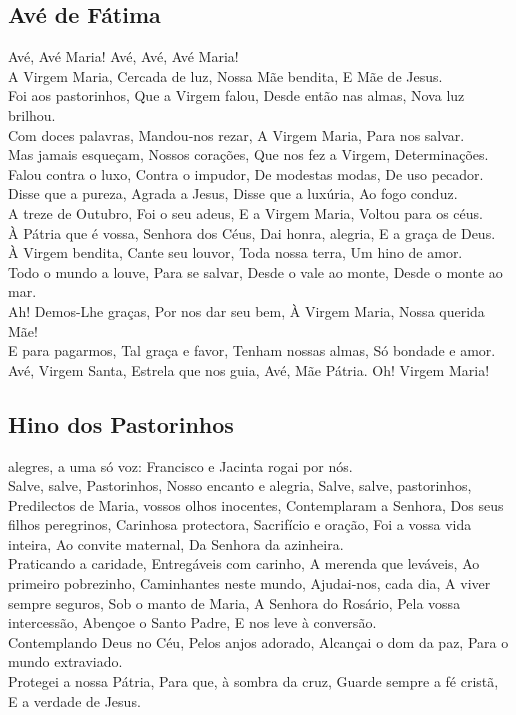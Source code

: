\subsection{Avé de Fátima}
 Avé, Avé Maria! Avé, Avé, Avé Maria!\\
A Virgem Maria, Cercada de luz, Nossa Mãe bendita, E Mãe de Jesus.\\
Foi aos pastorinhos, Que a Virgem falou, Desde então nas almas, Nova luz brilhou.\\
Com doces palavras, Mandou-nos rezar, A Virgem Maria, Para nos salvar.\\
Mas jamais esqueçam, Nossos corações, Que nos fez a Virgem, Determinações.\\
Falou contra o luxo, Contra o impudor, De modestas modas, De uso pecador.\\
Disse que a pureza, Agrada a Jesus, Disse que a luxúria, Ao fogo conduz.\\
A treze de Outubro, Foi o seu adeus, E a Virgem Maria, Voltou para os céus.\\
À Pátria que é vossa, Senhora dos Céus, Dai honra, alegria, E a graça de Deus.\\
À Virgem bendita, Cante seu louvor, Toda nossa terra, Um hino de amor.\\
Todo o mundo a louve, Para se salvar, Desde o vale ao monte, Desde o monte ao mar.\\
Ah! Demos-Lhe graças, Por nos dar seu bem, À Virgem Maria, Nossa querida Mãe!\\
E para pagarmos, Tal graça e favor, Tenham nossas almas, Só bondade e amor.\\
Avé, Virgem Santa, Estrela que nos guia, Avé, Mãe Pátria. Oh! Virgem Maria!\\

\subsection{Hino dos Pastorinhos}
 alegres, a uma só voz: Francisco e Jacinta rogai por nós.\\
Salve, salve, Pastorinhos, Nosso encanto e alegria, Salve, salve, pastorinhos, Predilectos de Maria, vossos olhos inocentes, Contemplaram a Senhora, Dos seus filhos peregrinos, Carinhosa protectora, Sacrifício e oração, Foi a vossa vida inteira, Ao convite maternal, Da Senhora da azinheira.\\
Praticando a caridade, Entregáveis com carinho, A merenda que leváveis, Ao primeiro pobrezinho, Caminhantes neste mundo, Ajudai-nos, cada dia, A viver sempre seguros, Sob o manto de Maria, A Senhora do Rosário, Pela vossa intercessão, Abençoe o Santo Padre, E nos leve à conversão.\\
Contemplando Deus no Céu, Pelos anjos adorado, Alcançai o dom da paz, Para o mundo extraviado.\\
Protegei a nossa Pátria, Para que, à sombra da cruz, Guarde sempre a fé cristã, E a verdade de Jesus.
